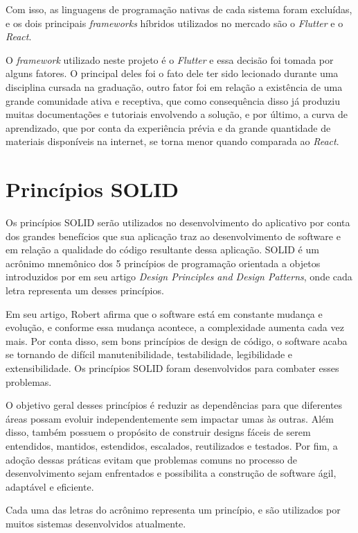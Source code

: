 Com isso, as linguagens de programação nativas de cada sistema foram excluídas, e os dois principais \textit{frameworks} híbridos utilizados no mercado são o \textit{Flutter} e o \textit{React}.

O \textit{framework} utilizado neste projeto é o \textit{Flutter} e essa decisão foi tomada por alguns fatores. O principal deles foi o fato dele ter sido lecionado durante uma disciplina cursada na graduação, outro fator foi em relação a existência de uma grande comunidade ativa e receptiva, que como consequência disso já produziu muitas documentações e tutoriais envolvendo a solução, e por último, a curva de aprendizado, que por conta da experiência prévia e da grande quantidade de materiais disponíveis na internet, se torna menor quando comparada ao \textit{React}.

\section{Princípios SOLID}\label{sec:solid}
Os princípios SOLID serão utilizados no desenvolvimento do aplicativo por conta dos grandes benefícios que sua aplicação traz ao desenvolvimento de software e em relação a qualidade do código resultante dessa aplicação. SOLID é um acrônimo mnemônico dos 5 princípios de programação orientada a objetos introduzidos por \textcite{unclebob} em seu artigo \textit{Design Principles and Design Patterns}, onde cada letra representa um desses princípios.

Em seu artigo, Robert afirma que o software está em constante mudança e evolução, e conforme essa mudança acontece, a complexidade aumenta cada vez mais. Por conta disso, sem bons princípios de design de código, o software acaba se tornando de difícil manutenibilidade, testabilidade, legibilidade e extensibilidade. Os princípios SOLID foram desenvolvidos para combater esses problemas.

O objetivo geral desses princípios é reduzir as dependências para que diferentes áreas possam evoluir independentemente sem impactar umas às outras. Além disso, também possuem o propósito de construir designs fáceis de serem entendidos, mantidos, estendidos, escalados, reutilizados e testados. Por fim, a adoção dessas práticas evitam que problemas comuns no processo de desenvolvimento sejam enfrentados e possibilita a construção de software ágil, adaptável e eficiente.

Cada uma das letras do acrônimo representa um princípio, e são utilizados por muitos sistemas desenvolvidos atualmente.

